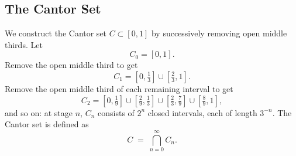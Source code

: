 \documentclass[11pt]{article}
\theoremstyle{definition}
\theoremstyle{plain}
\begin{document}
\subsection{The Cantor Set}

We construct the Cantor set $C \subset [0,1]$ by successively removing
open middle thirds. Let
\[
  C_0 = [0,1].
\]
Remove the open middle third to get
\[
  C_1 = \left[0,\tfrac{1}{3}\right] \cup \left[\tfrac{2}{3},1\right].
\]
Remove the open middle third of each remaining interval to get
\[
  C_2 = \left[0,\tfrac{1}{9}\right] \cup \left[\tfrac{2}{9},\tfrac{1}{3}\right]
        \cup \left[\tfrac{2}{3},\tfrac{7}{9}\right] \cup \left[\tfrac{8}{9},1\right],
\]
and so on: at stage $n$, $C_n$ consists of $2^{n}$ closed intervals,
each of length $3^{-n}$. The Cantor set is defined as
\[
  C \;=\; \bigcap_{n=0}^{\infty} C_n.
\]
\end{document}
